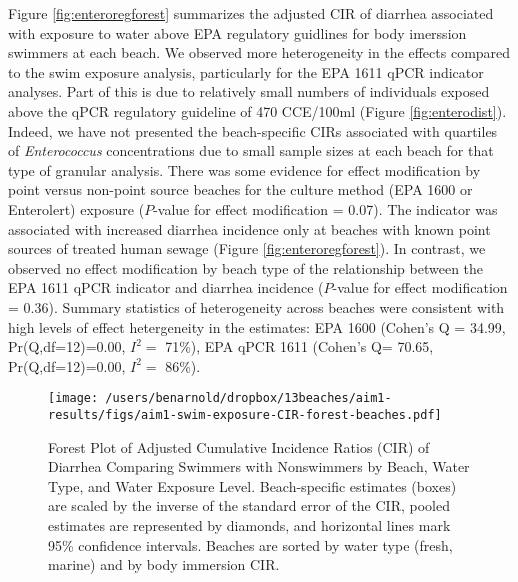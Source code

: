 \documentclass[12pt]{article}\usepackage[]{graphicx}\usepackage[]{color}
\begin{document}
Figure \ref{fig:enteroregforest} summarizes the adjusted CIR of diarrhea associated with exposure to water above EPA regulatory guidlines for body imerssion swimmers at each beach.  We observed more heterogeneity in the effects compared to the swim exposure analysis, particularly for the EPA 1611 qPCR indicator analyses.  Part of this is due to relatively small numbers of individuals exposed above the qPCR regulatory guideline of 470 CCE/100ml (Figure \ref{fig:enterodist}). Indeed, we have not presented the beach-specific CIRs associated with quartiles of \emph{Enterococcus} concentrations due to small sample sizes at each beach for that type of granular analysis. There was some evidence for effect modification by point versus non-point source beaches for the culture method (EPA 1600 or Enterolert) exposure ($P$-value for effect modification = 0.07). The indicator was associated with increased diarrhea incidence only at beaches with known point sources of treated human sewage (Figure \ref{fig:enteroregforest}). In contrast, we observed no effect modification by beach type of the relationship between the EPA 1611 qPCR indicator and diarrhea incidence ($P$-value for effect modification = 0.36). Summary statistics of heterogeneity across beaches\supercite{Higgins2002-vr, Higgins2003-bh} were consistent with high levels of effect hetergeneity in the estimates: EPA 1600 (Cohen's Q =
34.99, 
Pr(Q,df=12)=0.00,
$I^2=$ 71\%),
 EPA qPCR 1611 (Cohen's Q=
 70.65, 
Pr(Q,df=12)=0.00,
$I^2=$ 86\%).

\begin{landscape}
\begin{figure}[h!tb]
\begin{center}
\texttt{[image: /users/benarnold/dropbox/13beaches/aim1-results/figs/aim1-swim-exposure-CIR-forest-beaches.pdf]}
\caption{Forest Plot of Adjusted Cumulative Incidence Ratios (CIR) of Diarrhea Comparing Swimmers with Nonswimmers by Beach, Water Type, and Water Exposure Level. Beach-specific estimates (boxes) are scaled by the inverse of the standard error of the CIR, pooled estimates are represented by diamonds, and horizontal lines mark 95\% confidence intervals. Beaches are sorted by water type (fresh, marine) and by body immersion CIR. \label{fig:swimforest}}
\end{center}
\end{figure}
\end{landscape}
\end{document}
